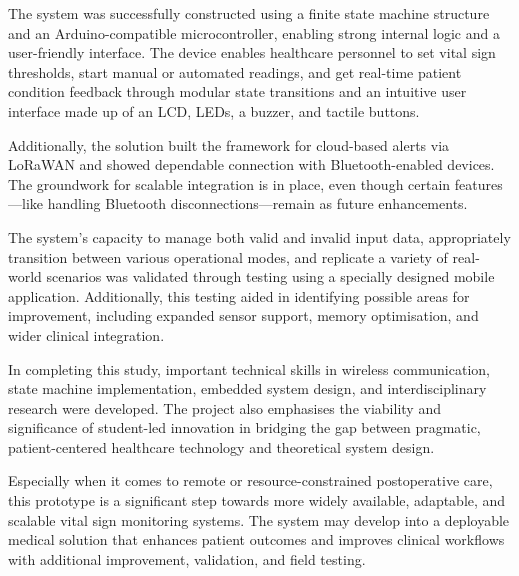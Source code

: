 The system was successfully constructed using a finite state machine structure and an Arduino-compatible microcontroller, enabling strong internal logic and a user-friendly interface. The device enables healthcare personnel to set vital sign thresholds, start manual or automated readings, and get real-time patient condition feedback through modular state transitions and an intuitive user interface made up of an LCD, LEDs, a buzzer, and tactile buttons.

Additionally, the solution built the framework for cloud-based alerts via LoRaWAN and showed dependable connection with Bluetooth-enabled devices. The groundwork for scalable integration is in place, even though certain features---like handling Bluetooth disconnections---remain as future enhancements.

The system's capacity to manage both valid and invalid input data, appropriately transition between various operational modes, and replicate a variety of real-world scenarios was validated through testing using a specially designed mobile application. Additionally, this testing aided in identifying possible areas for improvement, including expanded sensor support, memory optimisation, and wider clinical integration.

In completing this study, important technical skills in wireless communication, state machine implementation, embedded system design, and interdisciplinary research were developed. The project also emphasises the viability and significance of student-led innovation in bridging the gap between pragmatic, patient-centered healthcare technology and theoretical system design.

Especially when it comes to remote or resource-constrained postoperative care, this prototype is a significant step towards more widely available, adaptable, and scalable vital sign monitoring systems. The system may develop into a deployable medical solution that enhances patient outcomes and improves clinical workflows with additional improvement, validation, and field testing.
